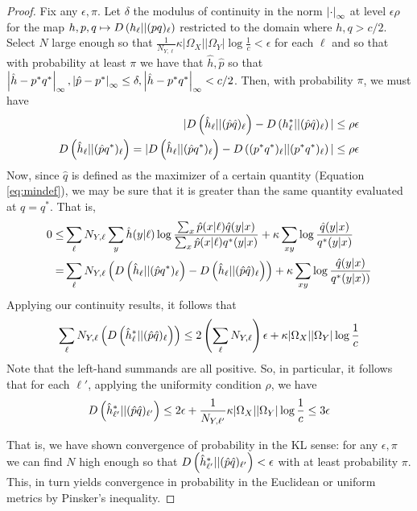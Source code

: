 \begin{proof}
Fix any $\epsilon,\pi$.  Let $\delta$ the modulus of continuity in the norm $\left|\cdot\right|_\infty$ at level $\epsilon\rho$ for the map $h,p,q \mapsto D\left(h_\ell||(pq)_\ell\right)$ restricted to the domain where $h,q>c/2$.  Select $N$ large enough so that $\frac{1}{N_{Y,\ell}} \kappa |\Omega_X||\Omega_Y| \log \frac{1}{c} < \epsilon$ for each $\ell$ and so that with probability at least $\pi$ we have that $\hat h,\hat p$ so that $\left|\hat h-p^*q^*\right|_\infty,\left|\hat p-p^*\right|_\infty\leq \delta,\left|\hat h - p^*q^*\right|_\infty<c/2$. Then, with probability $\pi$, we must have
%
\begin{align*}
|D\left(\hat h_\ell||(\hat p \hat q)_\ell\right) - D\left(h^*_\ell||(\hat p \hat q)_\ell\right)| \leq \rho \epsilon \\
D\left(\hat h_\ell||(\hat p q^*)_\ell\right) = |D\left(\hat h_\ell||(\hat p q^*)_\ell\right) - D\left((p^*q^*)_\ell||(p^* q^*)_\ell\right)| \leq \rho\epsilon 
\end{align*}
%
Now, since $\hat q$ is defined as the maximizer of a certain quantity (Equation \ref{eq:mindef}), we may be sure that it is greater than the same quantity evaluated at $q=q^*$.  That is,
%
\begin{align*}
0 \leq& \sum_\ell N_{Y,\ell}\sum_{y}\hat h(y|\ell)\log\frac{\sum_{x}\hat p(x|\ell)\hat q(y|x)}{\sum_{x}\hat p(x|\ell)q^*(y|x)} + \kappa \sum_{xy} \log \frac{\hat q(y|x)}{q^*(y|x)}\\
 =& \sum_\ell N_{Y,\ell}\left(D\left(\hat h_\ell||(\hat pq^*)_\ell\right) - D\left(\hat h_\ell||(\hat p\hat q)_\ell\right)\right) + \kappa \sum_{xy} \log \frac{\hat q(y|x)}{q^*(y|x))}
\end{align*}
%
Applying our continuity results, it follows that
%
\begin{gather*}
 \sum_\ell N_{Y,\ell}\left(D\left(\hat h^*_\ell||(\hat p\hat q)_\ell\right)\right)  \leq 2\left(\sum_\ell N_{Y,\ell}\right)\epsilon  + \kappa |\Omega_X||\Omega_Y| \log \frac{1}{c} 
\end{gather*}
%
Note that the left-hand summands are all positive.  So, in particular, it follows that for each $\ell'$, applying the uniformity condition $\rho$, we have
%
\begin{gather*}
D\left(\hat h^*_{\ell'}||(\hat p\hat q)_{\ell'}\right)  \leq 2\epsilon  + \frac{1}{N_{Y,\ell'}} \kappa |\Omega_X||\Omega_Y| \log \frac{1}{c} \leq 3\epsilon
\end{gather*}

That is, we have shown convergence of probability in the KL sense: for any $\epsilon,\pi$ we can find $N$ high enough so that $D\left(\hat h^*_{\ell'}||(\hat p\hat q)_{\ell'}\right)<\epsilon$ with at least probability $\pi$.  This, in turn yields convergence in probability in the Euclidean or uniform metrics by Pinsker's inequality. 
\end{proof}








































